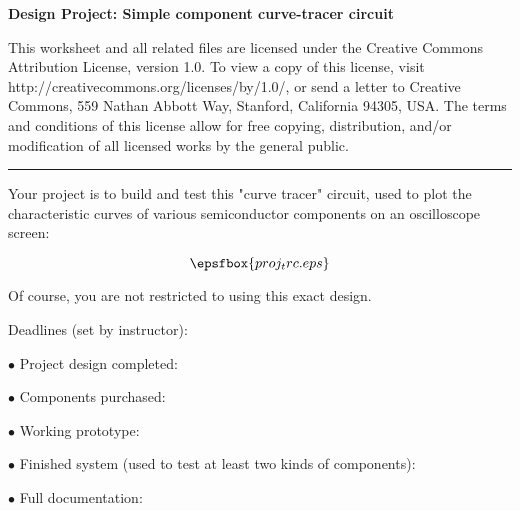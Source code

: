 
\centerline{\bf Design Project: Simple component curve-tracer circuit} \bigskip 
 
This worksheet and all related files are licensed under the Creative Commons Attribution License, version 1.0.  To view a copy of this license, visit http://creativecommons.org/licenses/by/1.0/, or send a letter to Creative Commons, 559 Nathan Abbott Way, Stanford, California 94305, USA.  The terms and conditions of this license allow for free copying, distribution, and/or modification of all licensed works by the general public.

\bigskip 

\hrule

\vskip 10pt

Your project is to build and test this "curve tracer" circuit, used to plot the characteristic curves of various semiconductor components on an oscilloscope screen:

$$\epsfbox{proj_trc.eps}$$

Of course, you are not restricted to using this exact design.

\vskip 10pt

\noindent
Deadlines (set by instructor):

\medskip
\item{$\bullet$} Project design completed: 
\item{$\bullet$} Components purchased:
\item{$\bullet$} Working prototype:
\item{$\bullet$} Finished system (used to test at least two kinds of components):
\item{$\bullet$} Full documentation:
\medskip




